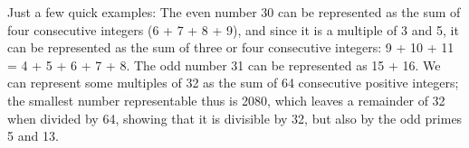 \documentclass[12pt]{article}
\begin{document}
Just a few quick examples: The even number 30 can be represented as the sum of four consecutive integers (6 + 7 + 8 + 9), and since it is a multiple of 3 and 5, it can be represented as the sum of three or four consecutive integers: 9 + 10 + 11 = 4 + 5 + 6 + 7 + 8. The odd number 31 can be represented as 15 + 16. We can represent some multiples of 32 as the sum of 64 consecutive positive integers; the smallest number representable thus is 2080, which leaves a remainder of 32 when divided by 64, showing that it is divisible by 32, but also by the odd primes 5 and 13.
\end{document}
